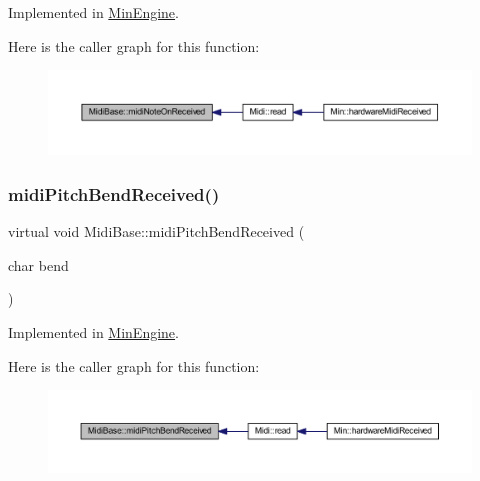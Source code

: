 Implemented in \hyperlink{class_min_engine_a108d70cfac8c363fbf6445f679dcf4d5}{Min\+Engine}.

Here is the caller graph for this function\+:
\nopagebreak
\begin{figure}[H]
\begin{center}
\leavevmode
\includegraphics[width=350pt]{class_midi_base_aa977f9f3db59b0a8b892ee28bcf93695_icgraph}
\end{center}
\end{figure}
\mbox{\label{class_midi_base_acfb1d2aef9901779bb53e0847121c13d}} 
\subsubsection{\texorpdfstring{midi\+Pitch\+Bend\+Received()}{midiPitchBendReceived()}}
{\footnotesize\ttfamily virtual void Midi\+Base\+::midi\+Pitch\+Bend\+Received (\begin{DoxyParamCaption}\item[{char}]{bend }\end{DoxyParamCaption})\hspace{0.3cm}{\ttfamily [pure virtual]}}



Implemented in \hyperlink{class_min_engine_a5b0f6a252cc4958e81d8989872105544}{Min\+Engine}.

Here is the caller graph for this function\+:
\nopagebreak
\begin{figure}[H]
\begin{center}
\leavevmode
\includegraphics[width=350pt]{class_midi_base_acfb1d2aef9901779bb53e0847121c13d_icgraph}
\end{center}
\end{figure}
\mbox{\label{class_midi_base_a968da0cf67e9a84757cbc2dbce90bc39}} 
